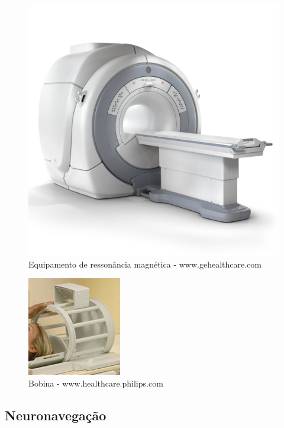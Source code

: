  
\begin{figure}[!htb]
\centering
\includegraphics[scale=0.2]{../user_guide_figures/rm_ge.jpg}
\caption{Equipamento de ressonância magnética - www.gehealthcare.com}
\end{figure}

\begin{figure}[!htb]
\centering
\includegraphics[scale=0.8]{../user_guide_figures/bobina.jpg}
\caption{Bobina - www.healthcare.philips.com}
\end{figure}

\subsection{Neuronavegação}
\label{sec:neuronavegador_intro}


